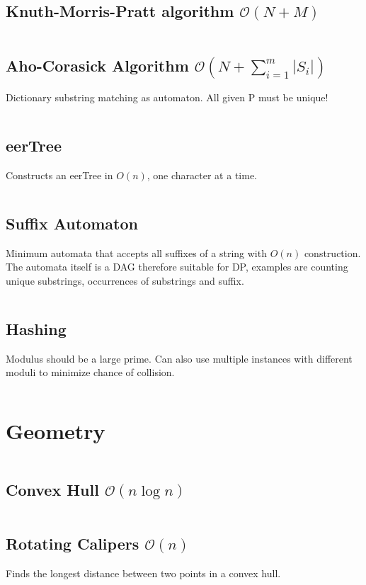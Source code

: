 \documentclass[9pt,a4paper,landscape,oneside]{amsart}
\newcommand{\mintedstyle}[2]{\inputminted{#1}{code/#2}}
\newcommand{\code}[1]{\mintedstyle{cpp}{#1}}
\begin{document}
\begin{multicols*}{3}
\subsection{Knuth-Morris-Pratt algorithm $\mathcal{O}(N + M)$}
\code{strings/kmp.cpp}

\subsection{Aho-Corasick Algorithm $\mathcal{O}(N + \sum_{i=1}^{m} |S_i|)$}
Dictionary substring matching as automaton. All given P must be unique!
\code{strings/aho_corasick.cpp}

\subsection{eerTree}
Constructs an eerTree in $O(n)$, one character at a time.
\code{strings/eertree.cpp}

\subsection{Suffix Automaton}
Minimum automata that accepts all suffixes of a string with $O(n)$
construction. The automata itself is a DAG therefore suitable for DP,
examples are counting unique substrings, occurrences of substrings and
suffix.
\code{strings/suffix_automaton.cpp}

\subsection{Hashing}
Modulus should be a large prime. Can also use multiple instances with
different moduli to minimize chance of collision.
\code{strings/hasher.cpp}

\section{Geometry}
\code{geometry/main.cpp}

\subsection{Convex Hull $\mathcal{O}(n \log n)$}
\code{geometry/convex_hull.cpp}

\subsection{Rotating Calipers $\mathcal{O}(n)$}
Finds the longest distance between two points in a convex hull.
\code{geometry/rotating_calipers.cpp}


\end{multicols*}
\end{document}
